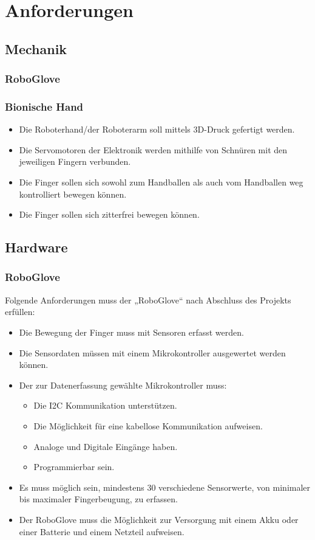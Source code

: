 \documentclass[11pt]{article}
\begin{document}
\section{Anforderungen}

\subsection{Mechanik}
\subsubsection{RoboGlove}
\subsubsection{Bionische Hand}

	\begin{itemize}
		\item Die Roboterhand/der Roboterarm soll mittels 3D-Druck gefertigt werden.
		\item Die Servomotoren der Elektronik werden mithilfe von Schnüren mit den jeweiligen Fingern verbunden.
		\item Die Finger sollen sich sowohl zum Handballen als auch vom Handballen weg kontrolliert bewegen können.
		\item Die Finger sollen sich zitterfrei bewegen können.
	\end{itemize}

\subsection{Hardware}
\subsubsection{RoboGlove}
Folgende Anforderungen muss der „RoboGlove“ nach Abschluss des Projekts erfüllen:

	\begin{itemize}
		\item Die Bewegung der Finger muss mit Sensoren erfasst werden.
		\item Die Sensordaten müssen mit einem Mikrokontroller ausgewertet werden können.
		\item Der zur Datenerfassung gewählte Mikrokontroller muss:
		\begin{itemize}
			\item Die I2C Kommunikation unterstützen.
			\item Die Möglichkeit für eine kabellose Kommunikation aufweisen.
			\item Analoge und Digitale Eingänge haben.
			\item Programmierbar sein.
		\end{itemize}
		\item Es muss möglich sein, mindestens 30 verschiedene Sensorwerte, von minimaler bis maximaler Fingerbeugung, 
		      zu erfassen.
		\item Der RoboGlove muss die Möglichkeit zur Versorgung mit einem Akku oder einer Batterie und einem Netzteil 
		      aufweisen. 
	\end{itemize}
\end{document}
